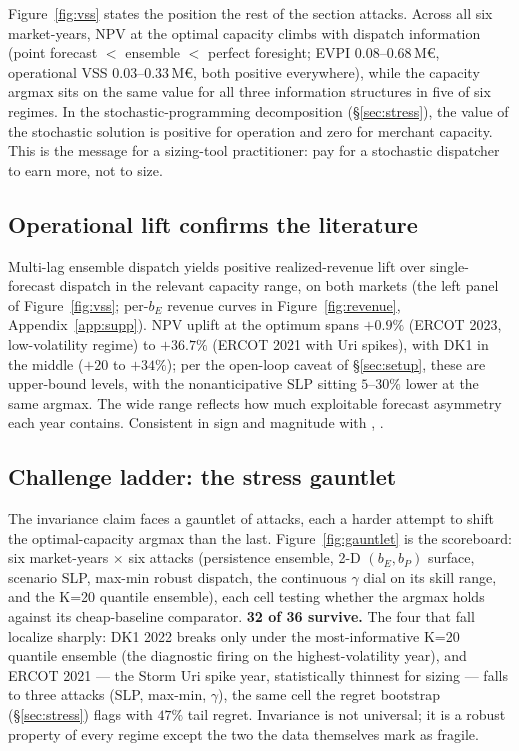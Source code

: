 \documentclass[11pt]{article}
\begin{document}
Figure~\ref{fig:vss} states the position the rest of the section attacks.
Across all six market-years, NPV at the optimal capacity climbs with
dispatch information (point forecast $<$ ensemble $<$ perfect foresight;
EVPI $0.08$--$0.68$\,M\euro, operational VSS $0.03$--$0.33$\,M\euro,
both positive everywhere), while the capacity argmax sits on the same
value for all three information structures in five of six regimes. In the
stochastic-programming decomposition (\S\ref{sec:stress}), the value of
the stochastic solution is positive for operation and zero for merchant
capacity. This is the message for a sizing-tool practitioner: pay for a
stochastic dispatcher to earn more, not to size.

\subsection{Operational lift confirms the literature}

Multi-lag ensemble dispatch yields positive realized-revenue lift over single-forecast dispatch in the relevant capacity range, on both markets (the left panel of Figure~\ref{fig:vss}; per-$b_E$ revenue curves in Figure~\ref{fig:revenue}, Appendix~\ref{app:supp}). NPV uplift at the optimum spans $+0.9\%$ (ERCOT 2023, low-volatility regime) to $+36.7\%$ (ERCOT 2021 with Uri spikes), with DK1 in the middle ($+20$ to $+34\%$); per the open-loop caveat of \S\ref{sec:setup}, these are upper-bound levels, with the nonanticipative SLP sitting $5$--$30\%$ lower at the same argmax. The wide range reflects how much exploitable forecast asymmetry each year contains. Consistent in sign and magnitude with \citet{cao2020drl}, \citet{krishnamurthy2018stochastic}.

\subsection{Challenge ladder: the stress gauntlet}\label{sec:gauntlet}

The invariance claim faces a gauntlet of attacks, each a harder attempt
to shift the optimal-capacity argmax than the last. Figure~\ref{fig:gauntlet}
is the scoreboard: six market-years $\times$ six attacks (persistence
ensemble, 2-D $(b_E,b_P)$ surface, scenario SLP, max-min robust dispatch,
the continuous $\gamma$ dial on its skill range, and the K=20 quantile
ensemble), each cell testing whether the argmax holds against its
cheap-baseline comparator. \textbf{32 of 36 survive.} The four that fall
localize sharply: DK1 2022 breaks only under the most-informative K=20
quantile ensemble (the diagnostic firing on the highest-volatility year),
and ERCOT 2021 --- the Storm Uri spike year, statistically thinnest for
sizing --- falls to three attacks (SLP, max-min, $\gamma$), the same cell
the regret bootstrap (\S\ref{sec:stress}) flags with $47\%$ tail regret.
Invariance is not universal; it is a robust property of every regime
except the two the data themselves mark as fragile.
\end{document}
